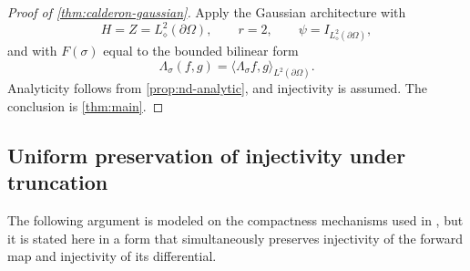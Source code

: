 \documentclass[11pt,oneside]{amsart}
\theoremstyle{plain}
\newtheorem{lemma}[theorem]{Lemma}
\theoremstyle{definition}
\theoremstyle{remark}
\newcommand{\norm}[1]{\left\lVert #1\right\rVert}
\newcommand{\calM}{\mathcal{M}}
\newcommand{\calS}{\mathcal{S}}
\newcommand{\calT}{\mathcal{T}}
\begin{document}
\begin{proof}[Proof of \cref{thm:calderon-gaussian}]
Apply the Gaussian architecture with
\[
    H=Z=L^2_\diamond(\partial\Omega),\qquad r=2,\qquad\psi=I_{L^2_\diamond(\partial\Omega)},
\]
and with $F(\sigma)$ equal to the bounded bilinear form 
\begin{equation*}
    \Lambda_\sigma(f,g)=\langle \Lambda_\sigma f,g\rangle_{L^2(\partial\Omega)}.
\end{equation*}
Analyticity follows from \cref{prop:nd-analytic}, and injectivity is assumed. The conclusion is \cref{thm:main}.
\end{proof}

\subsection{Uniform preservation of injectivity under truncation}\label{subsection:uniform-preservation-injectivity-truncation}
The following argument is modeled on the compactness mechanisms used in \cite{alberti2022infinite,alberti2022inverse}, but it is stated here in a form that simultaneously preserves injectivity of the forward map and injectivity of its differential.

\end{document}
